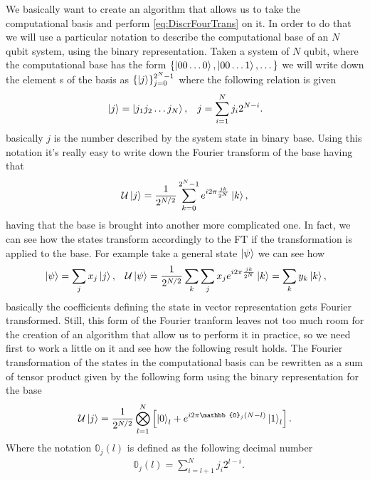 We basically want to create an algorithm that allows us to take the computational basis and perform \eqref{eq:DiscrFourTrans} on it. In order to do that we will use a particular notation to describe the computational base of an $N$ qubit system, using the binary representation.
{
    Taken a system of $N$ qubit, where the computational base has the form $\{\ket{00\dots 0}, \ket{00\dots 1}, \dots\}$ we will write down the element s of the basis as $\{\ket{j}\}_{j=0}^{2^N-1}$ where the following relation is given
    \begin{align}
        &\ket{j} = \ket{j_1j_2\dots j_N}, &j = \sum_{i=1}^N j_i 2^{N-i}.
    \end{align}
    basically $j$ is the number described by the system state in binary base.
}
\noindent
Using this notation it's really easy to write down the Fourier transform of the base having that
\begin{equation}
    \label{eq:QFT}
    \mathcal{U}\ket{j} = \frac{1}{2^{N/2}} \sum_{k=0}^{2^N-1} e^{i2\pi \frac{jk}{2^N}} \ket{k},
\end{equation}
having that the base is brought into another more complicated one. In fact, we can see how the states transform accordingly to the FT if the transformation is applied to the base. For example take a general state $\ket{\psi}$ we can see how
\begin{align}
    &\ket{\psi} = \sum_j x_j \ket{j}, &\mathcal{U}\ket{\psi} = \frac{1}{2^{N/2}} \sum_k\sum_j x_j e^{i2\pi \frac{jk}{2^N}} \ket{k} = \sum_k y_k\ket{k},
\end{align}
basically the coefficients defining the state in vector representation gets Fourier transformed. Still, this form of the Fourier tranform leaves not too much room for the creation of an algorithm that allow us to perform it in practice, so we need first to work a little on it and see how the following result holds.
{
    The Fourier transformation of the states in the computational basis can be rewritten as a sum of tensor product given by the following form using the binary representation for the base
    \begin{equation}
        \mathcal{U}\ket{j} = \frac{1}{2^{N/2}}\bigotimes_{l=1}^N\left[ \ket{0}_l + e^{i2\pi \mathbb{0}_j(N-l)}\ket{1}_l \right].
    \end{equation}
    Where the notation $\mathbb{0}_j(l)$ is defined as the following decimal number
    \begin{align}
        \label{eq:decimalForm}
        &\mathbb{0}_j(l) = \sum_{i=l+1}^N j_i2^{l - i}.
    \end{align}
}
